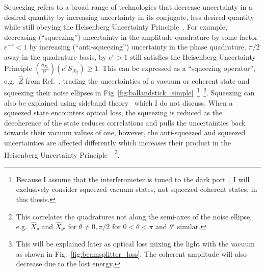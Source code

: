 Squeezing refers to a broad range of technologies that decrease uncertainty in a desired quantity by increasing uncertainty in its conjugate, less desired quantity while still obeying the Heisenberg Uncertainty Principle~\cite{}. For example, decreasing (``squeezing'') uncertainty in the amplitude quadrature by some factor $e^{-r}<1$ by increasing (``anti-squeezing'') uncertainty in the phase quadrature, $\pi/2$ away in the quadrature basis, by $e^r>1$ still satisfies the Heisenberg Uncertainty Principle $(\frac{S_{X_1}}{e^r}) (e^rS_{X_2})\geq1$.
This can be expressed as a ``squeezing operator'', e.g.\ $\hat Z$ from Ref.~\cite{}, trading the uncertainties of a vacuum or coherent state and squeezing their noise ellipses in Fig~\ref{fig:ballandstick_simple}~\footnote{Because I assume that the interferometer is tuned to the dark port~\cite{}, I will exclusively consider squeezed vacuum states, not squeezed coherent states, in this thesis.}~\footnote{This correlates the quadratures not along the semi-axes of the noise ellipse, e.g.\ $\hat{X}_\theta$ and $\hat{X}_{\theta'}$ for $\theta\neq0,\pi/2$ for $0<\theta<\pi$ and $\theta'$ similar.}.
Squeezing can also be explained using sideband theory~\cite{} which I do not discuss.
When a squeezed state encounters optical loss, the squeezing is reduced as the decoherence of the state reduces correlations and pulls the uncertainties back towards their vacuum values of one, however, the anti-squeezed and squeezed uncertainties are affected differently which increases their product in the Heisenberg Uncertainty Principle~\cite{}~\footnote{This will be explained later as optical loss mixing the light with the vacuum as shown in Fig.~\ref{fig:beamsplitter_loss}. The coherent amplitude will also decrease due to the lost energy.}. %

